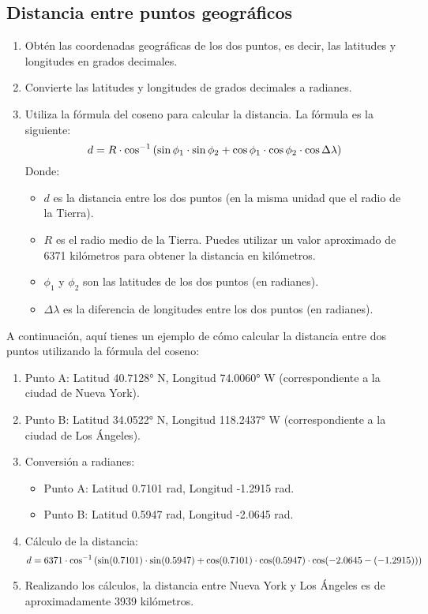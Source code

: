 \documentclass[
	12pt, %
	fleqn, %
	a4paper, %
	oneside, %
]{LegrandOrangeBook}
\begin{document}
\subsection*{Distancia entre puntos geográficos}
\begin{enumerate}
\item Obtén las coordenadas geográficas de los dos puntos, es decir, las latitudes y longitudes en grados decimales.
\item Convierte las latitudes y longitudes de grados decimales a radianes.
\item Utiliza la fórmula del coseno para calcular la distancia. La fórmula es la siguiente:
\begin{equation}
d=R\cdot\cos^{-1}\left(\sin\phi_1\cdot\sin\phi_2+\cos\phi_1\cdot\cos\phi_2\cdot\cos\Delta\lambda\right)
\end{equation}
Donde:
\begin{itemize}
\item $d$ es la distancia entre los dos puntos (en la misma unidad que el radio de la Tierra).
\item $R$ es el radio medio de la Tierra. Puedes utilizar un valor aproximado de 6371 kilómetros para obtener la distancia en kilómetros.
\item $\phi_1$ y $\phi_2$ son las latitudes de los dos puntos (en radianes).
\item $\Delta\lambda$ es la diferencia de longitudes entre los dos puntos (en radianes).
\end{itemize}
\end{enumerate}

A continuación, aquí tienes un ejemplo de cómo calcular la distancia entre dos puntos utilizando la fórmula del coseno:

\begin{enumerate}
\item Punto A: Latitud 40.7128° N, Longitud 74.0060° W (correspondiente a la ciudad de Nueva York).
\item Punto B: Latitud 34.0522° N, Longitud 118.2437° W (correspondiente a la ciudad de Los Ángeles).
\item Conversión a radianes:
\begin{itemize}
\item Punto A: Latitud 0.7101 rad, Longitud -1.2915 rad.
\item Punto B: Latitud 0.5947 rad, Longitud -2.0645 rad.
\end{itemize}
\item Cálculo de la distancia:
\begin{displaymath}
d=6371\cdot\cos^{-1}\left(\sin(0.7101)\cdot\sin(0.5947)+\cos(0.7101)\cdot\cos(0.5947)\cdot\cos(-2.0645-(-1.2915))\right)
\end{displaymath}
\item Realizando los cálculos, la distancia entre Nueva York y Los Ángeles es de aproximadamente 3939 kilómetros.
\end{enumerate}
\end{document}
